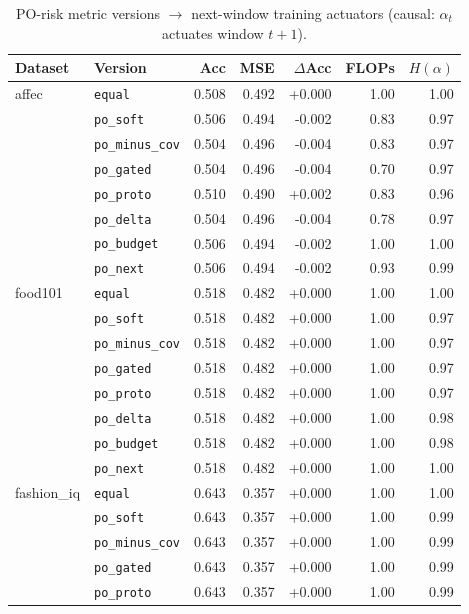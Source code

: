 \begin{table}[t]
\centering
\small
\caption{PO-risk metric versions $\rightarrow$ next-window training actuators (causal: $\alpha_t$ actuates window $t{+}1$).}
\label{tab:agod-po-risk-train}
\begin{tabular}{llrrrrr}
\toprule
Dataset & Version & Acc & MSE & $\Delta$Acc & FLOPs & $H(\alpha)$ \\
\midrule
affec & \texttt{equal} & 0.508 & 0.492 & +0.000 & 1.00 & 1.00 \\
 & \texttt{po\_soft} & 0.506 & 0.494 & -0.002 & 0.83 & 0.97 \\
 & \texttt{po\_minus\_cov} & 0.504 & 0.496 & -0.004 & 0.83 & 0.97 \\
 & \texttt{po\_gated} & 0.504 & 0.496 & -0.004 & 0.70 & 0.97 \\
 & \texttt{po\_proto} & 0.510 & 0.490 & +0.002 & 0.83 & 0.96 \\
 & \texttt{po\_delta} & 0.504 & 0.496 & -0.004 & 0.78 & 0.97 \\
 & \texttt{po\_budget} & 0.506 & 0.494 & -0.002 & 1.00 & 1.00 \\
 & \texttt{po\_next} & 0.506 & 0.494 & -0.002 & 0.93 & 0.99 \\
\midrule
food101 & \texttt{equal} & 0.518 & 0.482 & +0.000 & 1.00 & 1.00 \\
 & \texttt{po\_soft} & 0.518 & 0.482 & +0.000 & 1.00 & 0.97 \\
 & \texttt{po\_minus\_cov} & 0.518 & 0.482 & +0.000 & 1.00 & 0.97 \\
 & \texttt{po\_gated} & 0.518 & 0.482 & +0.000 & 1.00 & 0.97 \\
 & \texttt{po\_proto} & 0.518 & 0.482 & +0.000 & 1.00 & 0.97 \\
 & \texttt{po\_delta} & 0.518 & 0.482 & +0.000 & 1.00 & 0.98 \\
 & \texttt{po\_budget} & 0.518 & 0.482 & +0.000 & 1.00 & 0.98 \\
 & \texttt{po\_next} & 0.518 & 0.482 & +0.000 & 1.00 & 1.00 \\
\midrule
fashion\_iq & \texttt{equal} & 0.643 & 0.357 & +0.000 & 1.00 & 1.00 \\
 & \texttt{po\_soft} & 0.643 & 0.357 & +0.000 & 1.00 & 0.99 \\
 & \texttt{po\_minus\_cov} & 0.643 & 0.357 & +0.000 & 1.00 & 0.99 \\
 & \texttt{po\_gated} & 0.643 & 0.357 & +0.000 & 1.00 & 0.99 \\
 & \texttt{po\_proto} & 0.643 & 0.357 & +0.000 & 1.00 & 0.99 \\

\end{tabular}
\end{table}
